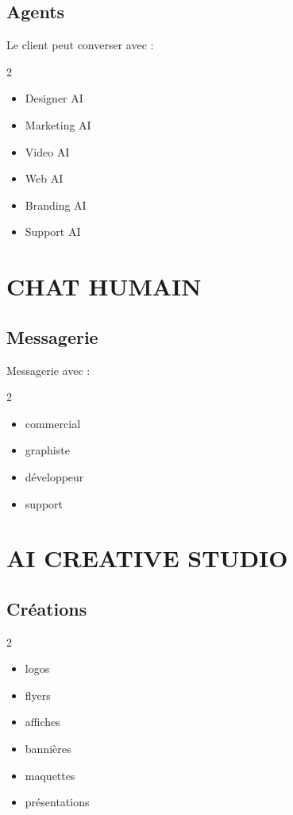 \documentclass[12pt,a4paper,oneside]{book}
\begin{document}
\section{Agents}
Le client peut converser avec :
\begin{multicols}{2}
\begin{itemize}
\item Designer AI
\item Marketing AI
\item Video AI
\item Web AI
\item Branding AI
\item Support AI
\end{itemize}
\end{multicols}

\chapter{CHAT HUMAIN}

\section{Messagerie}
Messagerie avec :
\begin{multicols}{2}
\begin{itemize}
\item commercial
\item graphiste
\item développeur
\item support
\end{itemize}
\end{multicols}

\chapter{AI CREATIVE STUDIO}

\section{Créations}
\begin{multicols}{2}
\begin{itemize}
\item logos
\item flyers
\item affiches
\item bannières
\item maquettes
\item présentations
\end{itemize}
\end{multicols}
\end{document}
